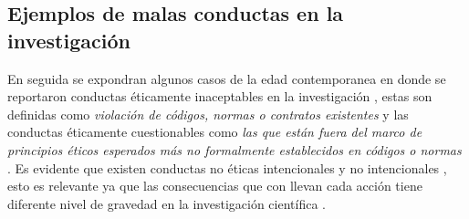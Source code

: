 \subsection{Ejemplos de malas conductas en la investigación}
En seguida se expondran algunos casos de la edad contemporanea en donde se reportaron conductas éticamente inaceptables en la investigación
, estas son definidas como \textit{violación de códigos, normas o contratos existentes} y las conductas éticamente
cuestionables como \textit{las que están fuera del marco de principios éticos esperados más no formalmente
establecidos en códigos o normas} \cite{M2013}. Es evidente que existen conductas no éticas intencionales y no intencionales
, esto es relevante ya que las consecuencias que con llevan cada acción tiene diferente nivel de gravedad en la 
investigación científica \cite{Shamoo2009}.\\\\

